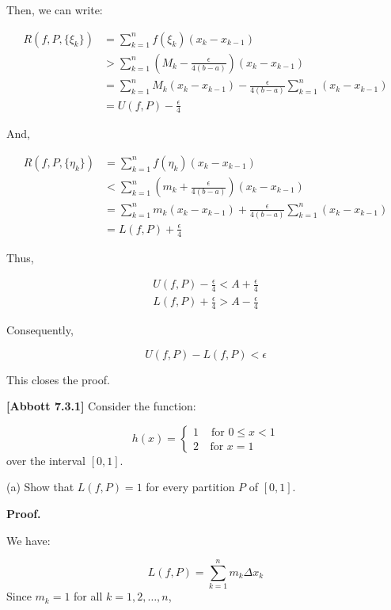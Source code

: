 \documentclass[10pt]{article}
\begin{document}
Then, we can write:

\begin{align*}
R(f,P,\{\xi_k\}) &= \sum_{k=1}^{n} f(\xi_k)(x_k - x_{k-1})\\
&>  \sum_{k=1}^{n} \left(M_k - \frac{\epsilon}{4(b-a)}\right)(x_k - x_{k-1})\\
&= \sum_{k=1}^{n} M_k (x_k - x_{k-1}) -  \frac{\epsilon}{4(b-a)}\sum_{k=1}^{n} (x_k - x_{k-1})\\
&= U(f,P) - \frac{\epsilon}{4}
\end{align*}

And,

\begin{align*}
R(f,P,\{\eta_k\}) &= \sum_{k=1}^{n} f(\eta_k)(x_k - x_{k-1})\\
&<  \sum_{k=1}^{n} \left(m_k + \frac{\epsilon}{4(b-a)}\right)(x_k - x_{k-1})\\
&= \sum_{k=1}^{n} m_k (x_k - x_{k-1}) +  \frac{\epsilon}{4(b-a)}\sum_{k=1}^{n} (x_k - x_{k-1})\\
&= L(f,P) + \frac{\epsilon}{4}
\end{align*}

Thus,

\begin{align*}
U(f,P) - \frac{\epsilon}{4} < A + \frac{\epsilon}{4} \\
L(f,P) + \frac{\epsilon}{4} > A - \frac{\epsilon}{4} 
\end{align*}

Consequently,

$$U(f,P) - L(f,P) < \epsilon$$

This closes the proof.

\textbf{[Abbott 7.3.1] }Consider the function:


\begin{equation*}
h( x) =\begin{cases}
1 & \text{ for } 0\leq x< 1\\
2 & \ \text{for } x=1
\end{cases}
\end{equation*}
over the interval $\displaystyle [ 0,1]$.



(a) Show that $\displaystyle L( f,P) =1$ for every partition $\displaystyle P$ of $\displaystyle [ 0,1]$.



\textbf{Proof.}



We have:


\begin{equation*}
L( f,P) =\sum _{k=1}^{n} m_{k} \Delta x_{k}
\end{equation*}
Since $\displaystyle m_{k} =1$ for all $\displaystyle k=1,2,\dotsc ,n$, 
\end{document}

